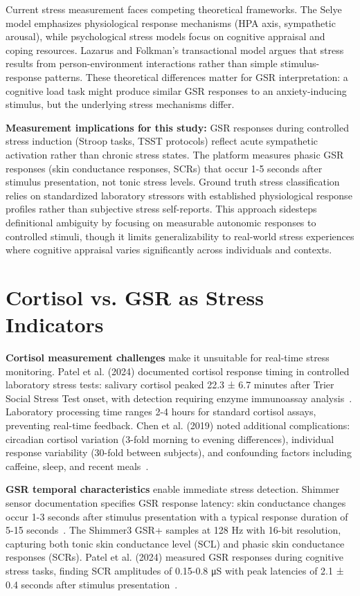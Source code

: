 Current stress measurement faces competing theoretical frameworks. The Selye model emphasizes physiological response mechanisms (HPA axis, sympathetic arousal), while psychological stress models focus on cognitive appraisal and coping resources. Lazarus and Folkman's transactional model argues that stress results from person-environment interactions rather than simple stimulus-response patterns. These theoretical differences matter for GSR interpretation: a cognitive load task might produce similar GSR responses to an anxiety-inducing stimulus, but the underlying stress mechanisms differ.

\textbf{Measurement implications for this study:} GSR responses during controlled stress induction (Stroop tasks, TSST protocols) reflect acute sympathetic activation rather than chronic stress states. The platform measures phasic GSR responses (skin conductance responses, SCRs) that occur 1-5 seconds after stimulus presentation, not tonic stress levels. Ground truth stress classification relies on standardized laboratory stressors with established physiological response profiles rather than subjective stress self-reports. This approach sidesteps definitional ambiguity by focusing on measurable autonomic responses to controlled stimuli, though it limits generalizability to real-world stress experiences where cognitive appraisal varies significantly across individuals and contexts.

\section{Cortisol vs. GSR as Stress Indicators}

\textbf{Cortisol measurement challenges} make it unsuitable for real-time stress monitoring. Patel et al. (2024) documented cortisol response timing in controlled laboratory stress tests: salivary cortisol peaked 22.3 ± 6.7 minutes after Trier Social Stress Test onset, with detection requiring enzyme immunoassay analysis~\cite{patel2024electrodermal}. Laboratory processing time ranges 2-4 hours for standard cortisol assays, preventing real-time feedback. Chen et al. (2019) noted additional complications: circadian cortisol variation (3-fold morning to evening differences), individual response variability (30-fold between subjects), and confounding factors including caffeine, sleep, and recent meals~\cite{chen2019neural}.

\textbf{GSR temporal characteristics} enable immediate stress detection. Shimmer sensor documentation specifies GSR response latency: skin conductance changes occur 1-3 seconds after stimulus presentation with a typical response duration of 5-15 seconds~\cite{shimmer2025gsr}. The Shimmer3 GSR+ samples at 128 Hz with 16-bit resolution, capturing both tonic skin conductance level (SCL) and phasic skin conductance responses (SCRs). Patel et al. (2024) measured GSR responses during cognitive stress tasks, finding SCR amplitudes of 0.15-0.8 μS with peak latencies of 2.1 ± 0.4 seconds after stimulus presentation~\cite{patel2024electrodermal}.

